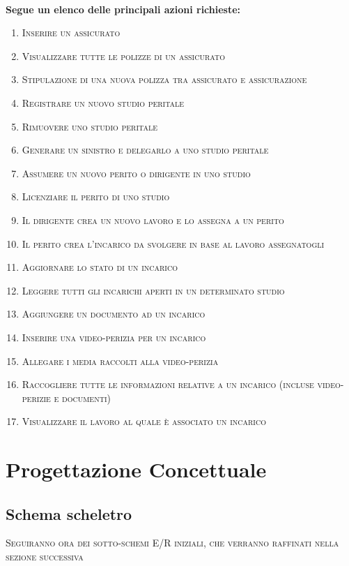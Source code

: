 \documentclass[a4paper,12pt]{report}
\begin{document}
\\
\textbf{Segue un elenco delle principali azioni richieste:}
\begin{enumerate}
    \item \textsc{Inserire un assicurato}
    \item \textsc{Visualizzare tutte le polizze di un assicurato}
    \item \textsc{Stipulazione di una nuova polizza tra assicurato e assicurazione}
    \item \textsc{Registrare un nuovo studio peritale}
    \item \textsc{Rimuovere uno studio peritale}
    \item \textsc{Generare un sinistro e delegarlo a uno studio peritale}
    \item \textsc{Assumere un nuovo perito o dirigente in uno studio}
    \item \textsc{Licenziare il perito di uno studio}
    \item \textsc{Il dirigente crea un nuovo lavoro e lo assegna a un perito}
    \item \textsc{Il perito crea l'incarico da svolgere in base al lavoro assegnatogli}
    \item \textsc{Aggiornare lo stato di un incarico}
    \item \textsc{Leggere tutti gli incarichi aperti in un determinato studio}
    \item \textsc{Aggiungere un documento ad un incarico}
    \item \textsc{Inserire una video-perizia per un incarico}
    \item \textsc{Allegare i media raccolti alla video-perizia}
    \item \textsc{Raccogliere tutte le informazioni relative a un incarico (incluse video-perizie e documenti)}
    \item \textsc{Visualizzare il lavoro al quale è associato un incarico}
\end{enumerate}


\chapter{Progettazione Concettuale}

\section{Schema scheletro}

\textsc{Seguiranno ora dei sotto-schemi E/R iniziali, che verranno raffinati nella sezione successiva}
\end{document}
